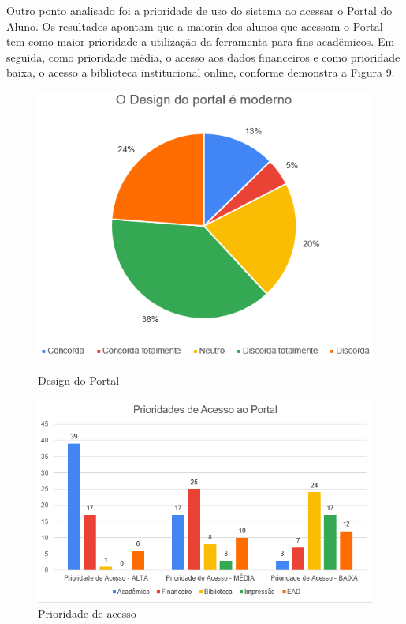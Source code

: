 \documentclass[12pt]{article}
\begin{document}
Outro ponto analisado foi a prioridade de uso do sistema ao acessar o Portal do Aluno. Os resultados apontam que a maioria dos alunos que acessam o Portal tem como maior prioridade a utilização da ferramenta para fins acadêmicos. Em seguida, como prioridade média, o acesso aos dados financeiros e como prioridade baixa, o acesso a biblioteca institucional online, conforme demonstra a Figura 9.
\begin{figure}
	\centering    
	\begin{minipage}{.4\columnwidth}
		\centering    
		\includegraphics[width=\textwidth,frame]{img8.png}
		\caption{Design do Portal}
		\label{fig:grafico5}
	\end{minipage}
	\begin{minipage}{.45\columnwidth}
		\centering
		\includegraphics[width=\textwidth,frame]{img9.png}
		\caption{Prioridade de acesso}
		\label{fig:grafico6}
	\end{minipage}
\end{figure}
\end{document}
